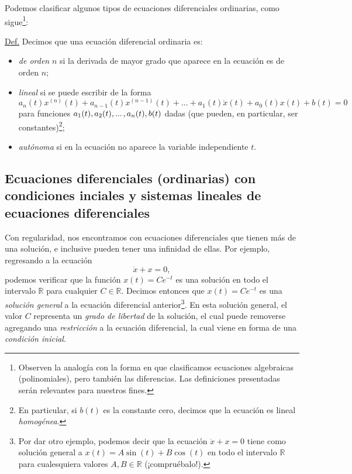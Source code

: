 \documentclass[12pt,libertine]{book}
\begin{document}
\vspace{2mm}
Podemos clasificar algunos tipos de ecuaciones diferenciales ordinarias, como sigue\footnote{Observen la analogía con la forma en que clasificamos ecuaciones algebraicas (polinomiales), pero también las diferencias. Las definiciones presentadas serán relevantes para nuestros fines.}:

\vspace{3mm}
\begin{tcolorbox}
\underline{Def.} Decimos que una ecuación diferencial ordinaria es:
\begin{itemize}
    \item \emph{de orden} $n$ si la derivada de mayor grado que aparece en la ecuación es de orden $n$;
    \item \emph{lineal} si se puede escribir de la forma $$a_n(t)x^{(n)}(t)+a_{n-1}(t)x^{(n-1)}(t)+...+a_1(t)\dot{x}(t)+a_0(t)x(t)+b(t)=0$$ para funciones $a_1(t),a_2(t),...\hspace{0.5mm},a_n(t),b(t)$ dadas (que pueden, en particular, ser constantes)\footnote{En particular, si $b(t)$ es la constante cero, decimos que la ecuación es lineal \textit{homogénea}.};
    \item \emph{autónoma} si en la ecuación no aparece la variable independiente $t$.
\end{itemize}
\end{tcolorbox}

\newpage
\subsection*{Ecuaciones diferenciales (ordinarias) con condiciones inciales y sistemas lineales de ecuaciones diferenciales} \label{Subsec:Ecuaciones diferenciales (ordinarias) con condiciones iniciales y sistemas lineales de ecuaciones diferenciales}

Con regularidad, nos encontramos con ecuaciones diferenciales que tienen más de una solución, e inclusive pueden tener una infinidad de ellas. Por ejemplo, regresando a la ecuación $$\dot{x} + x = 0,$$ podemos verificar que la función $x(t)=C e^{-t}$ es una solución en todo el intervalo $\mathbb{R}$ para cualquier $C\in\mathbb{R}$. Decimos entonces que $x(t)=Ce^{-t}$ es una \emph{solución general} a la ecuación diferencial anterior\footnote{Por dar otro ejemplo, podemos decir que la ecuación $\ddot{x}+x=0$ tiene como solución general a $x(t)=A\sin(t)+B\cos(t)$ en todo el intervalo $\mathbb{R}$ para cualesquiera valores $A,B\in\mathbb{R}$ (¡compruébalo!).}. En esta solución general, el valor $C$ representa un \emph{grado de libertad} de la solución, el cual puede removerse agregando una \emph{restricción} a la ecuación diferencial, la cual viene en forma de una \emph{condición inicial}.
\end{document}
